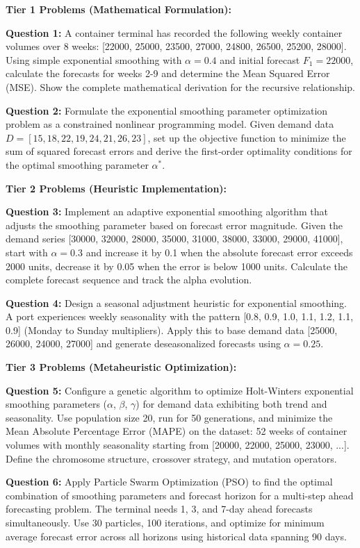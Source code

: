\documentclass{article}
\begin{document}
\textbf{Tier 1 Problems (Mathematical Formulation):}

\textbf{Question 1:} A container terminal has recorded the following weekly container volumes over 8 weeks: [22000, 25000, 23500, 27000, 24800, 26500, 25200, 28000]. Using simple exponential smoothing with $\alpha = 0.4$ and initial forecast $F_1 = 22000$, calculate the forecasts for weeks 2-9 and determine the Mean Squared Error (MSE). Show the complete mathematical derivation for the recursive relationship.

\textbf{Question 2:} Formulate the exponential smoothing parameter optimization problem as a constrained nonlinear programming model. Given demand data $D = [15, 18, 22, 19, 24, 21, 26, 23]$, set up the objective function to minimize the sum of squared forecast errors and derive the first-order optimality conditions for the optimal smoothing parameter $\alpha^*$.

\textbf{Tier 2 Problems (Heuristic Implementation):}

\textbf{Question 3:} Implement an adaptive exponential smoothing algorithm that adjusts the smoothing parameter based on forecast error magnitude. Given the demand series [30000, 32000, 28000, 35000, 31000, 38000, 33000, 29000, 41000], start with $\alpha = 0.3$ and increase it by 0.1 when the absolute forecast error exceeds 2000 units, decrease it by 0.05 when the error is below 1000 units. Calculate the complete forecast sequence and track the alpha evolution.

\textbf{Question 4:} Design a seasonal adjustment heuristic for exponential smoothing. A port experiences weekly seasonality with the pattern [0.8, 0.9, 1.0, 1.1, 1.2, 1.1, 0.9] (Monday to Sunday multipliers). Apply this to base demand data [25000, 26000, 24000, 27000] and generate deseasonalized forecasts using $\alpha = 0.25$.

\textbf{Tier 3 Problems (Metaheuristic Optimization):}

\textbf{Question 5:} Configure a genetic algorithm to optimize Holt-Winters exponential smoothing parameters ($\alpha$, $\beta$, $\gamma$) for demand data exhibiting both trend and seasonality. Use population size 20, run for 50 generations, and minimize the Mean Absolute Percentage Error (MAPE) on the dataset: 52 weeks of container volumes with monthly seasonality starting from [20000, 22000, 25000, 23000, ...]. Define the chromosome structure, crossover strategy, and mutation operators.

\textbf{Question 6:} Apply Particle Swarm Optimization (PSO) to find the optimal combination of smoothing parameters and forecast horizon for a multi-step ahead forecasting problem. The terminal needs 1, 3, and 7-day ahead forecasts simultaneously. Use 30 particles, 100 iterations, and optimize for minimum average forecast error across all horizons using historical data spanning 90 days.
\end{document}
